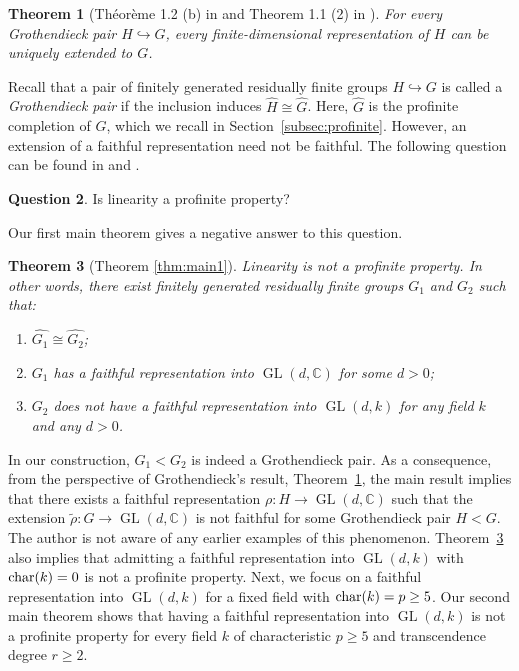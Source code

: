\documentclass[11pt]{amsart}
\newtheorem{thm}{Theorem}[section]
\theoremstyle{definition}
\newtheorem{ques}[thm]{Question}
\DeclareMathOperator{\GL}{GL}
\newcommand{\CC}{\mathbb{C}}
\begin{document}
 \begin{thm}[Théorème 1.2 (b) in \cite{grothendieck1970representations} and Theorem 1.1 (2) in \cite{jaikin2025some}] \label{thm:Grothendieck}
 For every Grothendieck pair $H \hookrightarrow G$, every finite-dimensional representation of $H$ can be uniquely extended to $G$.
 \end{thm}
 Recall that a pair of finitely generated residually finite groups $H \hookrightarrow G$ is called a \emph{Grothendieck pair} if the inclusion induces $\widehat{H} \cong \widehat{G}$.
 Here, $\widehat{G}$ is the profinite completion of $G$, which we recall in Section~\ref{subsec:profinite}.
 However, an extension of a faithful representation need not be faithful.
 The following question can be found in \cite{jaikin2025some} and \cite[(11) in Section 5.2]{bridson2026chasing}.

\begin{ques} \label{conj:Lpp}
 Is linearity a profinite property?
\end{ques}

 Our first main theorem gives a negative answer to this question.

 \begin{thm}[Theorem \ref{thm:main1}] \label{thm:intro-main1}
Linearity is not a profinite property.
In other words, there exist finitely generated residually finite groups $G_1$ and $G_2$ such that:
\begin{enumerate}[label=(\arabic*)]
  \item $\widehat{G_1} \cong \widehat{G_2}$;
  \item $G_1$ has a faithful representation into $\GL(d,\CC)$ for some $d>0$;
  \item $G_2$ does not have a faithful representation into $\GL(d,k)$ for any field $k$ and any $d>0$.
\end{enumerate}
\end{thm}

 In our construction, $G_1<G_2$ is indeed a Grothendieck pair. 
 As a consequence, from the perspective of Grothendieck's result, Theorem~\ref{thm:Grothendieck}, 
 the main result implies that there exists a faithful representation $\rho:H \to \GL(d,\CC)$ such that the extension $\tilde{\rho}:G \to \GL(d,\CC)$ is not faithful for some Grothendieck pair $H<G$.
 The author is not aware of any earlier examples of this phenomenon.
 Theorem~\ref{thm:intro-main1} also implies that admitting a faithful representation into $\GL(d,k)$ with $\textnormal{char}(k)=0$ is not a profinite property.
 Next, we focus on a faithful representation into $\GL(d,k)$ for a fixed field with  $\textnormal{char}(k)=p \geq 5$.
 Our second main theorem shows that having a faithful representation into $\GL(d,k)$ is not a profinite property for every field $k$ of characteristic $p \geq 5$ and transcendence degree $r \geq 2$.
\end{document}
